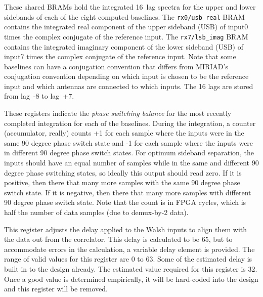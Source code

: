 \documentclass[12pt]{article}
\begin{document}
\begin{description}
\filbreak
{}
\bramn{$\vdots$}
 These shared BRAMs hold the integrated 16~lag spectra for
the upper and lower sidebands of each of the eight computed baselines.  The
\verb|rx0/usb_real| BRAM contains the integrated real component of the upper
sideband (USB) of input0 times the complex conjugate of the reference input.
The \verb|rx7/lsb_imag| BRAM contains the integrated imaginary component of the
lower sideband (USB) of input7 times the complex conjugate of the reference
input.  Note that some baselines can have a conjugation convention that differs
from MIRIAD's conjugation convention depending on which input is chosen to be
the reference input and which antennas are connected to which inputs.  The 16
lags are stored from lag~-8 to lag~+7.

\roregn{$\vdots$}
 These registers indicate the \emph{phase switching
balance} for the most recently completed integration for each of the baselines.
During the integration, a counter (accumulator, really) counts +1 for each
sample where the inputs were in the same 90 degree phase switch state and -1
for each sample where the inputs were in different 90 degree phase switch
states.  For optimum sideband separation, the inputs should have an equal
number of samples while in the same and different 90 degree phase switching
states, so ideally this output should read zero.  If it is positive, then there
that many more samples with the same 90 degree phase switch state.  If it is
negative, then there that many more samples with different 90 degree phase
switch state.  Note that the count is in FPGA cycles, which is half the number
of data samples (due to demux-by-2 data).

 This register adjusts the delay applied to the Walsh inputs to
align them with the data out from the correlator.  This delay is calculated to
be 65, but to accommodate errors in the calculation, a variable delay element
is provided.  The range of valid values for this register are 0 to 63.  Some of
the estimated delay is built in to the design already.  The estimated value
required for this register is 32.  Once a good value is determined empirically,
it will be hard-coded into the design and this register will be removed.

\end{description}
\end{document}
